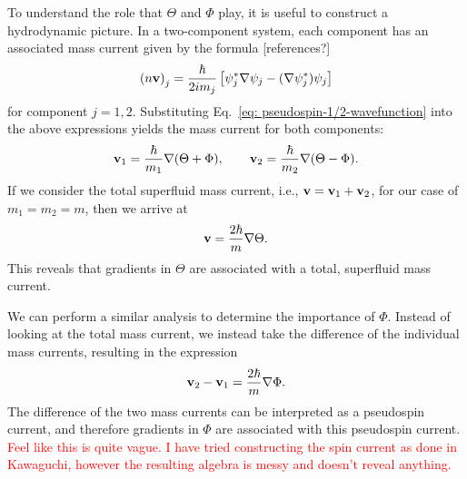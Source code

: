 To understand the role that \(\Theta \) and \(\Phi \) play, it is useful to
construct a hydrodynamic picture.
In a two-component system, each component has an associated mass current given
by the formula [references?]
\begin{equation}
    {(n\vb{v})}_j=\frac{\hbar}{2im_j}
    \left[\psi_j^*\nabla\psi_j-(\nabla\psi_j^*)\psi_j\right]
    \label{eq: two-comp-mass-current}
\end{equation}
for component \(j=1,2\).
Substituting Eq.~\eqref{eq: pseudospin-1/2-wavefunction} into the above
expressions yields the mass current for both components:
\begin{equation}
    \vb{v}_1 = \frac{\hbar}{m_1}\nabla(\Theta + \Phi), \qquad
    \vb{v}_2 = \frac{\hbar}{m_2}\nabla(\Theta - \Phi).
\end{equation}
If we consider the total superfluid mass current, i.e.,
\(\vb{v} = \vb{v}_1 + \vb{v}_2\), for our case of \(m_1=m_2=m\), then we arrive
at
\begin{equation}
    \vb{v} = \frac{2\hbar}{m}\nabla\Theta.
    \label{eq: two-comp-velocity}
\end{equation}
This reveals that gradients in \(\Theta \) are associated with a total,
superfluid mass current.

We can perform a similar analysis to determine the importance of \(\Phi \).
Instead of looking at the total mass current, we instead take the difference
of the individual mass currents, resulting in the expression
\begin{equation}
    \vb{v}_2 - \vb{v}_1 = \frac{2\hbar}{m}\nabla\Phi.
\end{equation}
The difference of the two mass currents can be interpreted as a pseudospin
current, and therefore gradients in \(\Phi \) are associated with this
pseudospin current.
\textcolor{red}{Feel like this is quite vague. I have tried constructing the
spin current as done in Kawaguchi, however the resulting algebra is messy and
doesn't reveal anything.}

